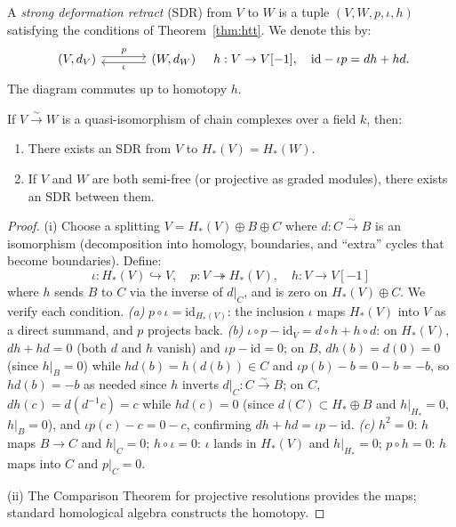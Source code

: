 \begin{definition}
\label{def:sdr}
A \emph{strong deformation retract} (SDR) from $V$ to $W$ is a tuple 
$(V, W, p, \iota, h)$ satisfying the conditions of Theorem~\ref{thm:htt}. 
We denote this by:
\[
\begin{tikzcd}[column sep=large]
(V, d_V) \arrow[r, shift left, "p"] & (W, d_W) \arrow[l, shift left, "\iota"]
\end{tikzcd}
\quad h: V \to V[-1], \quad \id - \iota p = dh + hd.
\]
The diagram commutes up to homotopy $h$.
\end{definition}

\begin{lemma}
\label{lem:sdr-existence}
If $V \xrightarrow{\sim} W$ is a quasi-isomorphism of chain complexes over a 
field $k$, then:
\begin{enumerate}[label=(\roman*)]
\item There exists an SDR from $V$ to $H_*(V) = H_*(W)$.
\item If $V$ and $W$ are both semi-free (or projective as graded modules), 
there exists an SDR between them.
\end{enumerate}
\end{lemma}

\begin{proof}
(i) Choose a splitting $V = H_*(V) \oplus B \oplus C$ where $d: C \xrightarrow{\sim} B$ 
is an isomorphism (decomposition into homology, boundaries, and ``extra'' cycles 
that become boundaries). Define:
\[
\iota: H_*(V) \hookrightarrow V, \quad p: V \twoheadrightarrow H_*(V), \quad 
h: V \to V[-1]
\]
where $h$ sends $B$ to $C$ via the inverse of $d|_C$, and is zero on $H_*(V) \oplus C$.
We verify each condition.
\emph{(a)} $p \circ \iota = \mathrm{id}_{H_*(V)}$: the inclusion $\iota$ maps $H_*(V)$ into $V$ as a direct summand, and $p$ projects back.
\emph{(b)} $\iota \circ p - \mathrm{id}_V = d \circ h + h \circ d$: on $H_*(V)$, $dh + hd = 0$ (both $d$ and $h$ vanish) and $\iota p - \mathrm{id} = 0$; on $B$, $dh(b) = d(0) = 0$ (since $h|_B = 0$) while $hd(b) = h(d(b)) \in C$ and $\iota p(b) - b = 0 - b = -b$, so $hd(b) = -b$ as needed since $h$ inverts $d|_C: C \xrightarrow{\sim} B$; on $C$, $dh(c) = d(d^{-1}c) = c$ while $hd(c) = 0$ (since $d(C) \subset H_* \oplus B$ and $h|_{H_*} = 0$, $h|_B = 0$), and $\iota p(c) - c = 0 - c$, confirming $dh + hd = \iota p - \mathrm{id}$.
\emph{(c)} $h^2 = 0$: $h$ maps $B \to C$ and $h|_C = 0$; $h \circ \iota = 0$: $\iota$ lands in $H_*(V)$ and $h|_{H_*} = 0$; $p \circ h = 0$: $h$ maps into $C$ and $p|_C = 0$.

(ii) The Comparison Theorem for projective resolutions provides the maps; 
standard homological algebra constructs the homotopy.
\end{proof}


